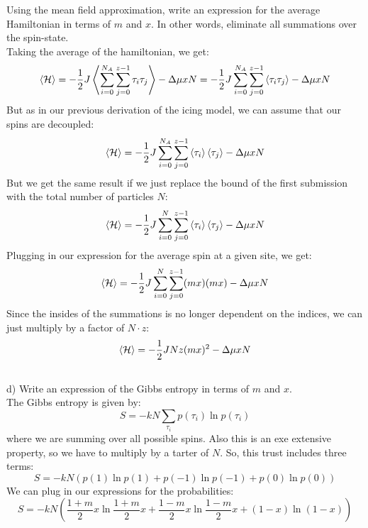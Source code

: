 \documentclass[12pt]{article}
\begin{document}
Using the mean field approximation, write an expression for the average Hamiltonian in terms of $m$ and $x$. In other words, eliminate all summations over the spin-state.\\
Taking the average of the hamiltonian, we get:
\begin{equation}
  \expval{\mathcal{H}} = -\frac{1}{2}J \expval{\sum_{i=0}^{N_{A}} \sum_{j=0}^{z-1} \tau_{i} \tau_{j}} - \Delta \mu xN = -\frac{1}{2}J \sum_{i=0}^{N_{A}} \sum_{j=0}^{z-1} \expval{\tau_{i} \tau_{j}} - \Delta \mu xN
\end{equation}
But as in our previous derivation of the icing model, we can assume that our spins are decoupled:
\begin{equation}
  \expval{\mathcal{H}} = -\frac{1}{2}J \sum_{i=0}^{N_{A}} \sum_{j=0}^{z-1} \expval{\tau_{i}} \expval{\tau_{j}} - \Delta \mu xN
\end{equation}
But we get the same result if we just replace the bound of the first submission with the total number of particles $N$:
\begin{equation}
  \expval{\mathcal{H}} = -\frac{1}{2}J \sum_{i=0}^{N} \sum_{j=0}^{z-1} \expval{\tau_{i}} \expval{\tau_{j}} - \Delta \mu xN
\end{equation}
Plugging in our expression for the average spin at a given site, we get:
\begin{equation}
  \expval{\mathcal{H}} = -\frac{1}{2}J \sum_{i=0}^{N} \sum_{j=0}^{z-1} (m x) (m x) - \Delta \mu xN
\end{equation}
Since the insides of the summations is no longer dependent on the indices, we can just multiply by a factor of $N\cdot z$:
\begin{equation}
  \expval{\mathcal{H}} = -\frac{1}{2}J N z (m x)^{2} - \Delta \mu xN
\end{equation}
\subsection{}
d) Write an expression of the Gibbs entropy in terms of $m$ and $x$.\\
The Gibbs entropy is given by:
\begin{equation}
  S=-kN \sum_{\tau_{i}} p(\tau_{i}) \ln p(\tau_{i})
\end{equation}
where we are summing over all possible spins. Also this is an exe extensive property, so we have to multiply by a tarter of $N$. So, this trust includes three terms:
\begin{equation}
  S = -kN \left( p(1) \ln p(1) + p(-1) \ln p(-1) + p(0) \ln p(0) \right) 
\end{equation}
We can plug in our expressions for the probabilities:
\begin{equation}
  S = -kN \left( \frac{1 + m}{2}x \ln \frac{1 + m}{2}x + \frac{1 - m}{2}x \ln \frac{1 - m}{2}x + (1 - x) \ln (1 - x) \right)
\end{equation}
\end{document}
